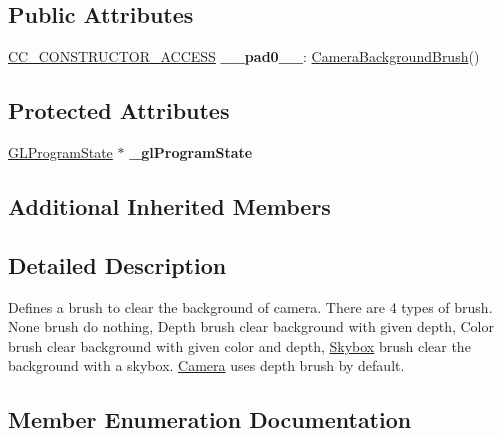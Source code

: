\subsection*{Public Attributes}
\begin{DoxyCompactItemize}
\item 
\mbox{\label{classCameraBackgroundBrush_abaded3f5a46c6e0e60105903a434e797}} 
\hyperlink{_2cocos2d_2cocos_2base_2ccConfig_8h_a25ef1314f97c35a2ed3d029b0ead6da0}{C\+C\+\_\+\+C\+O\+N\+S\+T\+R\+U\+C\+T\+O\+R\+\_\+\+A\+C\+C\+E\+SS} {\bfseries \+\_\+\+\_\+pad0\+\_\+\+\_\+}\+: \hyperlink{classCameraBackgroundBrush}{Camera\+Background\+Brush}()
\end{DoxyCompactItemize}
\subsection*{Protected Attributes}
\begin{DoxyCompactItemize}
\item 
\mbox{\label{classCameraBackgroundBrush_a5b010d358258ed37107d241e03e3fb1e}} 
\hyperlink{classGLProgramState}{G\+L\+Program\+State} $\ast$ {\bfseries \+\_\+gl\+Program\+State}
\end{DoxyCompactItemize}
\subsection*{Additional Inherited Members}


\subsection{Detailed Description}
Defines a brush to clear the background of camera. There are 4 types of brush. None brush do nothing, Depth brush clear background with given depth, Color brush clear background with given color and depth, \hyperlink{classSkybox}{Skybox} brush clear the background with a skybox. \hyperlink{classCamera}{Camera} uses depth brush by default. 

\subsection{Member Enumeration Documentation}
\mbox{\label{classCameraBackgroundBrush_acb83e8d05e7ab9386c041d22c444760f}} 
